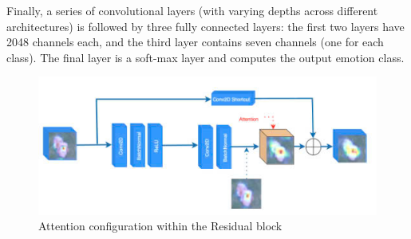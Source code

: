 \documentclass[pdflatex,sn-mathphys-num]{sn-jnl}%
\theoremstyle{thmstyleone}%
\theoremstyle{thmstyletwo}%
\theoremstyle{thmstylethree}%
\begin{document}
Finally, a series of convolutional layers (with varying depths across different architectures) is followed by three fully connected layers: the first two layers have 2048 channels each, and the third layer contains seven channels (one for each class). The final layer is a soft-max layer and computes the output emotion class.

\begin{figure}[ht]  
    \centering  
    \begin{minipage}{0.6\textwidth}  
        \centering  
        \includegraphics[width=\textwidth]{Figures/residual_config.jpg}  
        \caption{Attention configuration within the Residual block}  
        \label{fig:hinh-anh-resnet18}  
    \end{minipage}%
    \begin{minipage}{0.3\textwidth}  
        \centering  
        

\end{minipage}
\end{figure}
\end{document}

